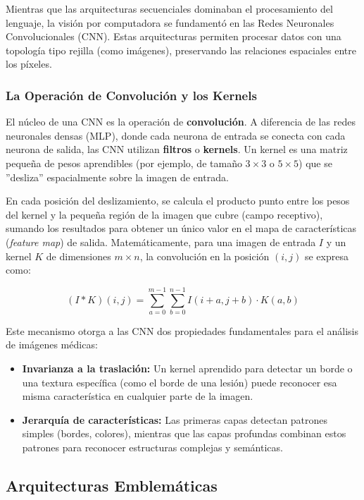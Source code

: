 \documentclass[11pt, a4paper]{article}
\begin{document}
Mientras que las arquitecturas secuenciales dominaban el procesamiento del lenguaje, la visión por computadora se fundamentó en las Redes Neuronales Convolucionales (CNN). Estas arquitecturas permiten procesar datos con una topología
tipo rejilla (como imágenes), preservando las relaciones espaciales entre los píxeles.

\subsubsection{La Operación de Convolución y los Kernels}

El núcleo de una CNN es la operación de \textbf{convolución}. A diferencia de las redes neuronales densas (MLP), donde cada neurona de entrada se conecta con cada neurona de salida, las CNN utilizan \textbf{filtros} o \textbf{kernels}. Un kernel es
una matriz pequeña de pesos aprendibles (por ejemplo, de tamaño $3 \times 3$ o $5 \times 5$) que se ''desliza'' espacialmente sobre la imagen de entrada.

En cada posición del deslizamiento, se calcula el producto punto entre los pesos del kernel y la pequeña región de la imagen que cubre (campo receptivo), sumando los resultados para obtener un único valor en el mapa de características
(\textit{feature map}) de salida. Matemáticamente, para una imagen de entrada $I$ y un kernel $K$ de dimensiones $m \times n$, la convolución en la posición $(i, j)$ se expresa como:

\begin{equation}
    (I * K)(i, j) = \sum_{a=0}^{m-1} \sum_{b=0}^{n-1} I(i+a, j+b) \cdot K(a, b)
\end{equation}

Este mecanismo otorga a las CNN dos propiedades fundamentales para el análisis de imágenes médicas:
\begin{itemize}
    \item \textbf{Invarianza a la traslación:} Un kernel aprendido para detectar un borde o una textura específica (como el borde de una lesión) puede reconocer esa misma característica en cualquier parte de la imagen.
    \item \textbf{Jerarquía de características:} Las primeras capas detectan patrones simples (bordes, colores), mientras que las capas profundas combinan estos patrones para reconocer estructuras complejas y semánticas.

\end{itemize}
\subsection{Arquitecturas Emblemáticas}
\end{document}
